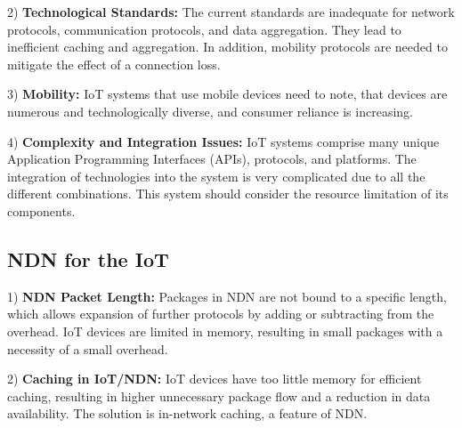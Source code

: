 \documentclass[conference]{IEEEtran}
\begin{document}
  2) \textbf{Technological Standards:}
  The current standards are inadequate for network protocols, communication protocols, and data aggregation. They lead to inefficient caching and aggregation. 
  In addition, mobility protocols are needed to mitigate the effect of a connection loss. 
  
  3) \textbf{Mobility:}
  IoT systems that use mobile devices need to note, that devices are numerous and technologically diverse, and consumer reliance is increasing. 
  
  
  4) \textbf{Complexity and Integration Issues:}
  IoT systems comprise many unique Application Programming Interfaces (APIs), protocols, and platforms. 
  The integration of technologies into the system is very complicated due to all the different combinations. This system should consider the resource limitation of its components.
  
  \subsection{NDN for the IoT}
  
  1) \textbf{NDN Packet Length:}
  Packages in NDN are not bound to a specific length, which allows expansion of further protocols by adding or subtracting from the overhead.
  IoT devices are limited in memory, resulting in small packages with a necessity of a small overhead.
  
  
  
  
  2) \textbf{Caching in IoT/NDN:}
  IoT devices have too little memory for efficient caching, resulting in higher unnecessary package flow and a reduction in data availability.
  The solution is in-network caching, a feature of NDN.  
  
\end{document}
